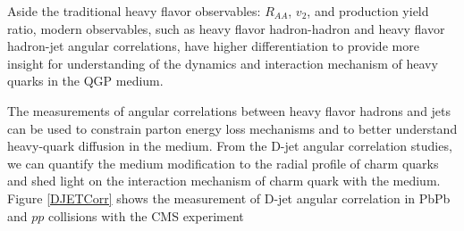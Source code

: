 Aside the traditional heavy flavor observables: $R_{AA}$, $v_{2}$, and production yield ratio, modern observables, such as heavy flavor hadron-hadron and heavy flavor hadron-jet angular correlations, have higher differentiation to provide more insight for understanding of the dynamics and interaction mechanism of heavy quarks in the QGP medium. 

The measurements of angular correlations between heavy flavor hadrons and jets can be used to constrain parton energy loss mechanisms and to better understand heavy-quark diffusion in the medium. From the D-jet angular correlation studies, we can quantify the medium modification to the radial profile of charm quarks and shed light on the interaction mechanism of charm quark with the medium. Figure \ref{DJETCorr} shows the measurement of D-jet angular correlation in PbPb and $pp$ collisions with the CMS experiment \cite{CMSDJet}

